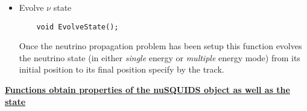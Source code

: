 \begin{itemize}
\begin{lstlisting}
    double EvalMassAtNode(unsigned int eig, unsigned int ie,
                           unsigned int rho=0) const;
    double EvalMass(unsigned int eig, double enu,
                     unsigned int rho=0) const;
  \end{lstlisting}
{\ttfamily EvalMassAtNode} returns the content a given neutrino mass eigenstate specified by {\ttfamily eig} ({ = $\nu_1$}, { = $\nu_2$}, { = $\nu_3$, ...}) at an energy node {\ttfamily ie}. Furthermore, {\ttfamily EvalMass} returns the approximate content of a given mass eigenstate for a specific neutrino energy  {\ttf enu} by interpolating in the interaction basis. In each function, when considering  {\ttf  NT = both}, the parameter {\ttf rho} toggles between {\ttf neutrino (0)} and {\ttf antineutrino (1)}.
\item Evolve $\nu$ state
  \begin{lstlisting}
    void EvolveState();
  \end{lstlisting}
Once the neutrino propagation problem has been setup this function evolves the neutrino state (in either {\it single} energy or {\it multiple} energy mode) from its initial position to its final position specify by the {\ttfamily track}.
\end{itemize}

\underline{\textbf{Functions obtain properties of the nuSQUIDS object as well as the state}}

